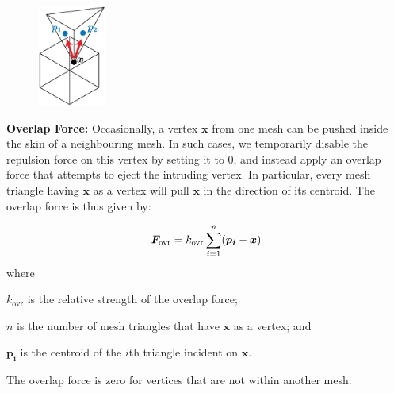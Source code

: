 

\bigskip

\begin{figure}
\vspace{-15pt}
\centering
    \includegraphics[width=0.2\textwidth]{figures/repulsionpak/overlap_forces.pdf}
\end{figure}
\textbf{Overlap Force:}
Occasionally, a vertex $\bm{x}$ from one mesh can be pushed inside the skin of a
neighbouring mesh.  In such cases, we temporarily disable the repulsion force
on this vertex
by setting it to 0, and instead apply an overlap force that attempts to
eject the intruding vertex.  In particular, every mesh triangle having $\bm{x}$
as a vertex will pull $\bm{x}$ in the direction of its centroid.  The overlap
force is thus given by:

\begin{equation}
\bm{F}_\mathrm{ovr} = k_\mathrm{ovr} \sum_{i = 1}^{n} (\bm{p_{i}} - \bm{x})
\end{equation}
where
\begin{packeddescriptions}
	\item[$k_\mathrm{ovr}$] is the relative strength of the overlap force;
	\item[$n$] is the number of mesh triangles that have $\bm{x}$ as a vertex; and
	\item[$\bm{p_{i}}$] is the centroid of the $i$th triangle incident on $\bm{x}$.
\end{packeddescriptions}

The overlap force is zero for vertices that are not within another mesh.

\bigskip

